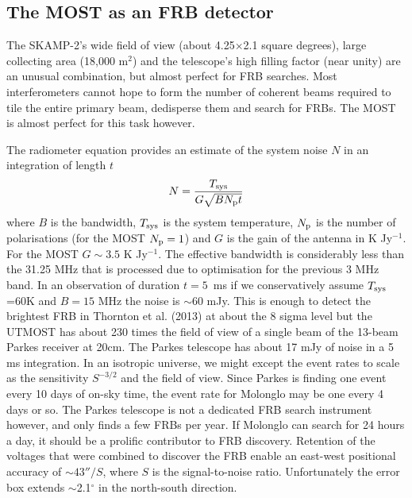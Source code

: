 \subsection{The MOST as an FRB detector}
The SKAMP-2's wide field of view (about 4.25$\times$2.1 square degrees), large collecting area (18,000 m$^2$) and the telescope's high filling factor (near unity) are an unusual combination, but almost perfect for FRB searches. Most interferometers cannot hope to form the number of coherent beams required to tile the entire primary beam, dedisperse them and search for FRBs. The MOST is almost perfect for this task however. 

The radiometer equation provides an estimate of the system noise $N$ in an integration of length $t$ 
\begin{equation}
N={{T_{\rm sys}}\over{G\sqrt{BN_{\rm p}t}}}
\end{equation}
\noindent where $B$ is the bandwidth, $T_{\rm sys}$ is the system temperature, $N_{\rm p}$ is the number of polarisations (for the MOST $N_{\rm p}=1$) and $G$ is the gain of the antenna in K Jy$^{-1}$. For the MOST $G\sim 3.5$ K Jy$^{-1}$. The effective bandwidth is considerably less than the 31.25 MHz that is processed due to optimisation for the previous 3 MHz band. In an observation of duration $t=5$\, ms if we conservatively assume $T_{\rm sys}$=60K and $B=15 $ MHz the noise is $\sim$60 mJy. This is enough to detect the brightest FRB in Thornton et al. (2013) at about the 8 sigma level but the UTMOST has about 230 times the field of view of a single beam of the 13-beam Parkes receiver at 20cm. The Parkes telescope has about 17 mJy of noise in a 5 ms integration. In an isotropic universe, we might except the event rates to scale as the sensitivity $S^{-3/2}$ and the field of view. Since Parkes is finding one event every 10 days of on-sky time, the event rate for Molonglo may be one every 4 days or so. The Parkes telescope is not a dedicated FRB search instrument however, and only finds a few FRBs per year. If Molonglo can search for 24 hours a day, it should be a prolific contributor to FRB discovery. Retention of the voltages that were combined to discover the FRB enable an east-west positional accuracy of $\sim 43''/S$, where $S$ is the signal-to-noise ratio. Unfortunately the error box extends $\sim$2.1$^{\circ}$ in the north-south direction.
